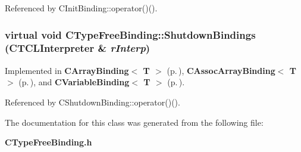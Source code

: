 Referenced by CInit\-Binding::operator()().
\subsubsection{\setlength{\rightskip}{0pt plus 5cm}virtual void CType\-Free\-Binding::Shutdown\-Bindings ({\bf CTCLInterpreter} \& {\em r\-Interp})\hspace{0.3cm}{\tt  [pure virtual]}}\label{classCTypeFreeBinding_a2}




Implemented in {\bf CArray\-Binding$<$ T $>$} {\rm (p.\,\pageref{classCArrayBinding_a12})}, {\bf CAssoc\-Array\-Binding$<$ T $>$} {\rm (p.\,\pageref{classCAssocArrayBinding_a14})}, and {\bf CVariable\-Binding$<$ T $>$} {\rm (p.\,\pageref{classCVariableBinding_a15})}.

Referenced by CShutdown\-Binding::operator()().

The documentation for this class was generated from the following file:\begin{CompactItemize}
\item 
{\bf CType\-Free\-Binding.h}\end{CompactItemize}
